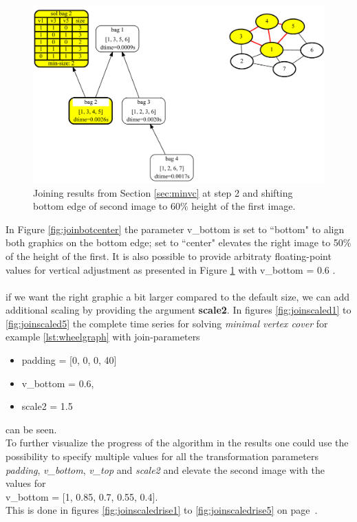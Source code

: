 \documentclass[a4paper, 12pt, bibliography=totoc]{scrartcl}
\begin{document}
\begin{figure}[H]
	\centering
	\includegraphics[width=0.9\linewidth,height=0.9\textheight,keepaspectratio]{images/SVGJOIN/default_062.pdf}
	\caption[Joining results and shifting vertically to 60\%]{Joining results from Section \ref{sec:minvc} at step 2 and shifting bottom edge of second image to $60\%$ height of the first image.}
	\label{fig:join60}
\end{figure}

In Figure \ref{fig:joinbotcenter} the parameter v\_bottom is set to ``bottom" to align both graphics on the bottom edge; set to ``center" elevates the right image to 50\% of the height of the first. It is also possible to provide arbitraty floating-point values for vertical adjustment as presented in Figure \ref{fig:join60} with v\_bottom = 0.6 .\\
\\
if we want the right graphic a bit larger compared to the default size, we can add additional scaling by providing the argument \textbf{scale2}. In figures \ref{fig:joinscaled1} to \ref{fig:joinscaled5} the complete time series for solving \textit{minimal vertex cover} for example \ref{lst:wheelgraph} with join-parameters
\begin{itemize}
	\item[] padding = [0, 0, 0, 40]
	\item[] v\_bottom = 0.6,
	\item[] scale2 = 1.5
\end{itemize}
can be seen. \\
To further visualize the progress of the algorithm in the results one could use the possibility to specify multiple values for all the transformation parameters \textit{padding}, \textit{v\_bottom}, \textit{v\_top} and \textit{scale2} and elevate the second image with the values for\\
 v\_bottom = [1, 0.85, 0.7, 0.55, 0.4]. \\
 This is done in figures \ref{fig:joinscaledrise1} to \ref{fig:joinscaledrise5} on page~\pageref{fig:joinscaledrise1}.
\end{document}

